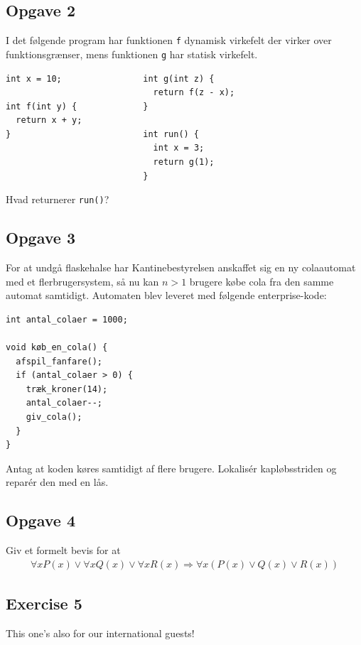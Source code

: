 \newpage
\subsection{Opgave 2}

I det følgende program har funktionen \texttt{f} dynamisk virkefelt der virker
over funktionsgrænser, mens funktionen \texttt{g} har statisk virkefelt.

\begin{verbatim}
int x = 10;                int g(int z) {
                             return f(z - x);
int f(int y) {             }
  return x + y;
}                          int run() {
                             int x = 3;
                             return g(1);
                           }
\end{verbatim}

\noindent{}Hvad returnerer \texttt{run()}?


\subsection{Opgave 3}

For at undgå flaskehalse har Kantinebestyrelsen anskaffet sig en ny colaautomat
med et flerbrugersystem, så nu kan $n > 1$ brugere købe cola fra den samme
automat samtidigt.  Automaten blev leveret med følgende enterprise-kode:
\begin{verbatim}
int antal_colaer = 1000;

void køb_en_cola() {
  afspil_fanfare();
  if (antal_colaer > 0) {
    træk_kroner(14);
    antal_colaer--;
    giv_cola();
  }
}
\end{verbatim}
Antag at koden køres samtidigt af flere brugere.  Lokalisér kapløbsstriden og
reparér den med en lås.


\subsection{Opgave 4}

Giv et formelt bevis for at
\begin{align*}
\forall x P(x) \lor \forall x Q(x) \lor \forall x R(x) \Rightarrow
\forall x \left(P(x) \lor Q(x) \lor R(x)\right)
\end{align*}


\subsection{Exercise 5}

This one's also for our international guests!

